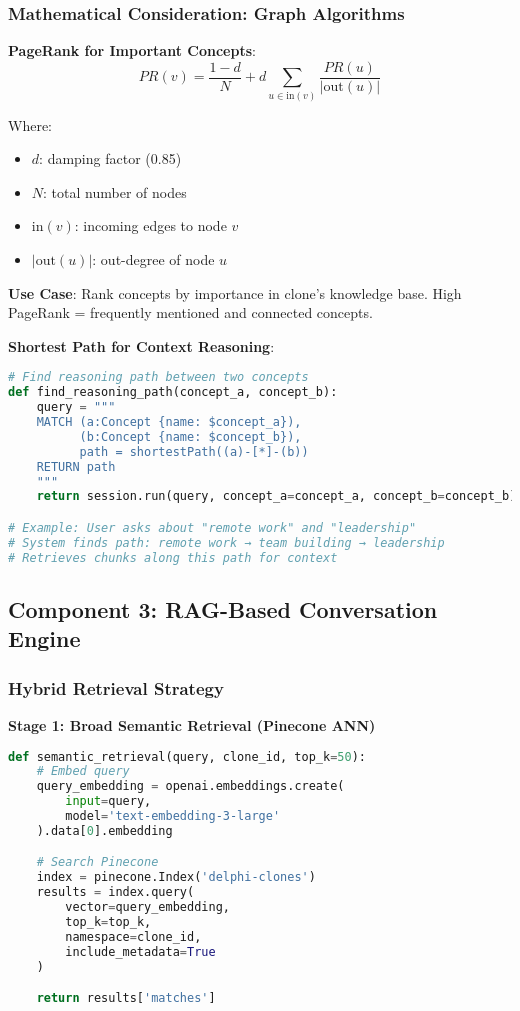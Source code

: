 \documentclass[10pt]{article}
\begin{document}
\subsubsection{Mathematical Consideration: Graph Algorithms}

\textbf{PageRank for Important Concepts}:
\[
PR(v) = \frac{1-d}{N} + d \sum_{u \in \text{in}(v)} \frac{PR(u)}{|\text{out}(u)|}
\]

Where:
\begin{itemize}[leftmargin=*]
    \item $d$: damping factor (0.85)
    \item $N$: total number of nodes
    \item $\text{in}(v)$: incoming edges to node $v$
    \item $|\text{out}(u)|$: out-degree of node $u$
\end{itemize}

\textbf{Use Case}: Rank concepts by importance in clone's knowledge base. High PageRank = frequently mentioned and connected concepts.

\textbf{Shortest Path for Context Reasoning}:
\begin{lstlisting}[language=Python]
# Find reasoning path between two concepts
def find_reasoning_path(concept_a, concept_b):
    query = """
    MATCH (a:Concept {name: $concept_a}),
          (b:Concept {name: $concept_b}),
          path = shortestPath((a)-[*]-(b))
    RETURN path
    """
    return session.run(query, concept_a=concept_a, concept_b=concept_b)

# Example: User asks about "remote work" and "leadership"
# System finds path: remote work → team building → leadership
# Retrieves chunks along this path for context
\end{lstlisting}

\subsection{Component 3: RAG-Based Conversation Engine}

\subsubsection{Hybrid Retrieval Strategy}

\textbf{Stage 1: Broad Semantic Retrieval (Pinecone ANN)}
\begin{lstlisting}[language=Python]
def semantic_retrieval(query, clone_id, top_k=50):
    # Embed query
    query_embedding = openai.embeddings.create(
        input=query,
        model='text-embedding-3-large'
    ).data[0].embedding

    # Search Pinecone
    index = pinecone.Index('delphi-clones')
    results = index.query(
        vector=query_embedding,
        top_k=top_k,
        namespace=clone_id,
        include_metadata=True
    )

    return results['matches']
\end{lstlisting}
\end{document}

